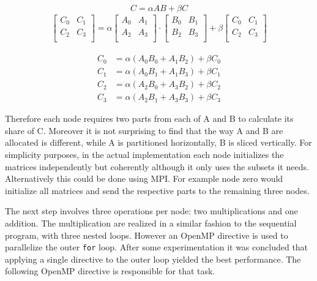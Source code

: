 \begin{equation}
C = \alpha AB + \beta C
\end{equation}
\begin{align}
    \begin{bmatrix}
      C_0 & C_1 \\
      C_2 & C_3 \\
    \end{bmatrix}
= \alpha
    \begin{bmatrix}
      A_0 & A_1 \\
      A_2 & A_3 \\
    \end{bmatrix}
\cdot
    \begin{bmatrix}
      B_0 & B_1 \\
      B_2 & B_3 \\
    \end{bmatrix}
+ \beta
    \begin{bmatrix}
      C_0 & C_1 \\
      C_2 & C_3 \\
    \end{bmatrix}
\label{eq:partition}
\end{align}

\begin{align}
C_0 &= \alpha (A_0 B_0 + A_1 B_2) + \beta C_0\\
C_1 &= \alpha (A_0 B_1 + A_1 B_3) + \beta C_1\\
C_2 &= \alpha (A_2 B_0 + A_3 B_2) + \beta C_2\\
C_3 &= \alpha (A_2 B_1 + A_3 B_3) + \beta C_3
\label{eq:partition2}
\end{align}

Therefore each node requires two parts from each of A and B to calculate its share of C. Moreover it is not surprising to find that the way A and B are allocated is different, while A is partitioned horizontally, B is sliced vertically. For simplicity purposes, in the actual implementation each node initializes the matrices independently but coherently although it only uses the subsets it needs. Alternatively this could be done using MPI. For example node zero would initialize all matrices and send the respective parts to the remaining three nodes.

The next step involves three operations per node: two multiplications and one addition. The multiplication are realized in a similar fashion to the sequential program, \ie with three nested loops. However an OpenMP directive is used to parallelize the outer \texttt{for} loop. After some experimentation it was concluded that applying a single directive to the outer loop yielded the best performance.
The following OpenMP directive is responsible for that task.

